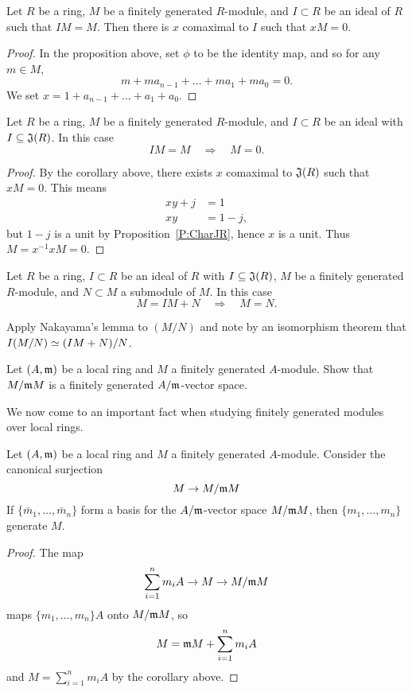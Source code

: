 \documentclass{ximera}
\begin{document}
\begin{corollary}
  Let $R$ be a ring, $M$ be a finitely generated $R$-module, and
  $I\subset R$ be an ideal of $R$ such that $IM = M$. Then there is
  $x$ comaximal to $I$ such that $xM = 0$.
  \begin{proof}
    In the proposition above, set $\phi$ to be the identity map, and
    so for any $m\in M$,
    \[
    m + m a_{n-1} + \dots + m a_1 + m a_0 = 0.
    \]
    We set $x = 1 + a_{n-1} + \dots + a_1 + a_0$.
  \end{proof}
\end{corollary}

\begin{corollary}
  Let $R$ be a ring, $M$ be a finitely generated $R$-module, and
  $I\subset R$ be an ideal with $I\subseteq \mathfrak J(R)$. In this case
  \[
  IM = M \quad\Rightarrow\quad M = 0.
  \]
  \begin{proof}
    By the corollary above, there exists $x$ comaximal to $\mathfrak J(R)$
    such that $xM = 0$. This means
    \begin{align*}
      xy + j &= 1\\
      xy &= 1-j,
    \end{align*}
    but $1-j$ is a unit by Proposition~\ref{P:CharJR}, hence $x$ is a
    unit. Thus $M = x^{-1}x M = 0$.
  \end{proof}
\end{corollary}

\begin{corollary}
  Let $R$ be a ring, $I\subset R$ be an ideal of $R$ with $I\subseteq \mathfrak
  J(R)$, $M$ be a finitely generated $R$-module, and $N\subset M$ a
  submodule of $M$. In this case
  \[
  M = IM + N \quad \Rightarrow \quad M = N.
  \]
  \begin{sketch}
    Apply Nakayama's lemma to $(M/N)$ and note by an isomorphism
    theorem that $I(M/N)\simeq (IM + N)/N$.
  \end{sketch}
\end{corollary}

\begin{exercise}
  Let $(A,\mathfrak{m})$ be a local ring and $M$ a finitely generated
  $A$-module. Show that $M/\mathfrak{m} M$ is a finitely generated $A/\mathfrak{m}$-vector space.
\end{exercise}


We now come to an important fact when studying finitely generated
modules over local rings.

\begin{corollary}
  Let $(A,\mathfrak{m})$ be a local ring and $M$ a finitely generated
  $A$-module. Consider the canonical surjection
  \[
  M \to  M/\mathfrak{m} M
  \]
  If $\{\bar{m}_1,\dots, \bar{m}_n\}$ form a basis for the $A/\mathfrak{m}$-vector
  space $M/\mathfrak{m} M$, then $\{m_1,\dots, m_n\}$ generate $M$.
  \begin{proof}
    The map
    \[
    \sum_{i=1}^n m_iA \to M \to M/\mathfrak{m} M
    \]
    maps $\{m_1,\dots, m_n\}A$ onto $M/\mathfrak{m} M$, so
    \[
    M = \mathfrak{m} M + \sum_{i=1}^n m_iA 
    \]
    and $M = \sum_{i=1}^n m_iA$ by the corollary above.
  \end{proof}
\end{corollary}
\end{document}

